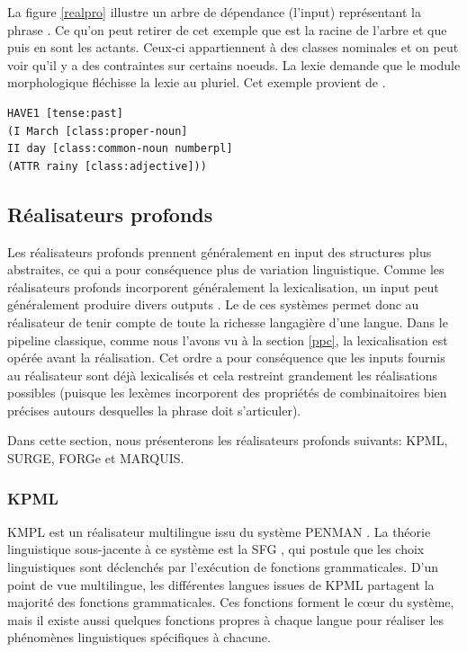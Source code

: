La figure \ref{realpro} illustre un arbre de dépendance (l'input) représentant la phrase . Ce qu'on peut retirer de cet exemple que  est la racine de l'arbre et que  puis  en sont les actants. Ceux-ci appartiennent à des classes nominales et on peut voir qu'il y a des contraintes sur certains noeuds. La lexie  demande que le module morphologique fléchisse la lexie au pluriel. Cet exemple provient de \cite{ReiterBuildingNaturalLanguage2000}.

\begin{minipage}{\linewidth}
\begin{lstlisting}[language=Xml, caption=Input, label=realpro]
HAVE1 [tense:past]
(I March [class:proper-noun]
II day [class:common-noun numberpl]
(ATTR rainy [class:adjective]))
\end{lstlisting}
\end{minipage}

\subsection{Réalisateurs profonds}

Les réalisateurs profonds prennent généralement en input des structures plus abstraites, ce qui a pour conséquence plus de variation linguistique. Comme les réalisateurs profonds incorporent généralement la lexicalisation, un input peut généralement produire divers outputs \citep{PolguerePourmodelestratifie}. Le  de ces systèmes permet donc au réalisateur de tenir compte de toute la richesse langagière d'une langue. Dans le pipeline classique, comme nous l'avons vu à la section \ref{ppc}, la lexicalisation est opérée avant la réalisation. Cet ordre a pour conséquence que les inputs fournis au réalisateur sont déjà lexicalisés et cela restreint grandement les réalisations possibles (puisque les lexèmes incorporent des propriétés de combinaitoires bien précises autours desquelles la phrase doit s'articuler). 

Dans cette section, nous présenterons les réalisateurs profonds suivants: KPML, SURGE, FORGe et MARQUIS.

\subsubsection{KPML}
KMPL \citep{BatemanEnablingTechnologyMultilingual1997} est un réalisateur multilingue issu du système PENMAN \citep{PenmanOverview}. La théorie linguistique sous-jacente à ce système est la \ac{SFG} \citep{MatthiessenSystemicfunctionalgrammar1997}, qui postule que les choix linguistiques sont déclenchés par l'exécution de fonctions grammaticales. D'un point de vue multilingue, les différentes langues issues de KPML partagent la majorité des fonctions grammaticales. Ces fonctions forment le c\oe{}ur du système, mais il existe aussi quelques fonctions propres à chaque langue pour réaliser les phénomènes linguistiques spécifiques à chacune.

